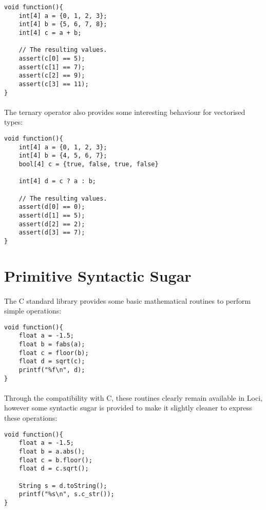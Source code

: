 \documentclass[12pt,twoside,notitlepage]{report}
\begin{document}
\small{
\begin{verbatim}
void function(){
    int[4] a = {0, 1, 2, 3};
    int[4] b = {5, 6, 7, 8};
    int[4] c = a + b;
    
    // The resulting values.
    assert(c[0] == 5);
    assert(c[1] == 7);
    assert(c[2] == 9);
    assert(c[3] == 11);
}
\end{verbatim}
}

\paragraph{}
The ternary operator also provides some interesting behaviour for vectorised types:

\small{
\begin{verbatim}
void function(){
    int[4] a = {0, 1, 2, 3};
    int[4] b = {4, 5, 6, 7};
    bool[4] c = {true, false, true, false}
    
    int[4] d = c ? a : b;
    
    // The resulting values.
    assert(d[0] == 0);
    assert(d[1] == 5);
    assert(d[2] == 2);
    assert(d[3] == 7);
}
\end{verbatim}
}

\section{Primitive Syntactic Sugar}

\paragraph{}
The C standard library provides some basic mathematical routines to perform simple operations:

\small{
\begin{verbatim}
void function(){
    float a = -1.5;
    float b = fabs(a);
    float c = floor(b);
    float d = sqrt(c);
    printf("%f\n", d);
}
\end{verbatim}
}

\paragraph{}
Through the compatibility with C, these routines clearly remain available in Loci, however some syntactic sugar is provided to make it slightly cleaner to express these operations:

\small{
\begin{verbatim}
void function(){
    float a = -1.5;
    float b = a.abs();
    float c = b.floor();
    float d = c.sqrt();
    
    String s = d.toString();
    printf("%s\n", s.c_str());
}
\end{verbatim}
}
\end{document}
